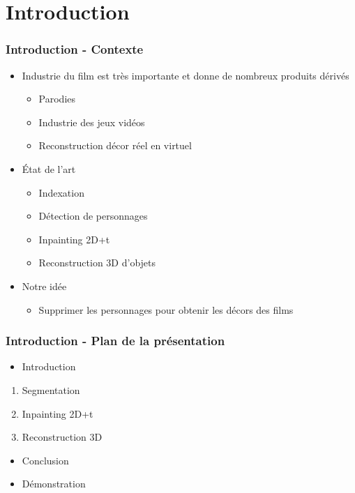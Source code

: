 \section{Introduction}
 \begin{frame}
   \frametitle{Introduction - Contexte}
   
   \begin{itemize}
   
   \item Industrie du film est très importante et donne de nombreux produits dérivés
   	\begin{itemize}
   	\item Parodies
   	\item Industrie des jeux vidéos
   	\item Reconstruction décor réel en virtuel
   	\end{itemize}
   
   \item État de l'art
   	\begin{itemize}
   	\item Indexation
   	\item Détection de personnages
   	\item Inpainting 2D+t
   	\item Reconstruction 3D d'objets

   	\end{itemize}
   	
   \item Notre idée
   	\begin{itemize}
   	\item Supprimer les personnages pour obtenir les décors des films
   	\end{itemize}
   
   \end{itemize}
 
 \end{frame}


\begin{frame}
  \frametitle{Introduction - Plan de la présentation}
  \begin{itemize}
  \item Introduction
  \end{itemize}
  \begin{enumerate}
  \item Segmentation
  \item Inpainting 2D+t
  \item Reconstruction 3D
  \end{enumerate}
  \begin{itemize}
  \item Conclusion
  \item Démonstration
  \end{itemize}
  

\end{frame}


